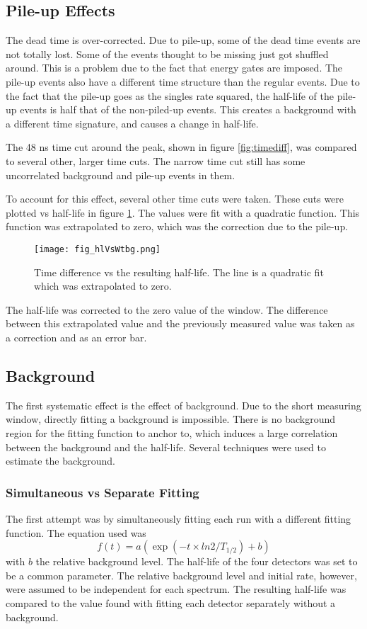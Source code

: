 \documentclass[MaxHughesThesis.tex]{subfiles}
\begin{document}
\subsection{Pile-up Effects}
The dead time is over-corrected. 
Due to pile-up, some of the dead time events are not totally lost.
Some of the events thought to be missing just got shuffled around.
This is a problem due to the fact that energy gates are imposed.
The pile-up events also have a different time structure than the regular events.
Due to the fact that the pile-up goes as the singles rate squared, the half-life of the pile-up events is half that of the non-piled-up events.
This creates a background with a different time signature, and causes a change in half-life.

The 48 ns time cut around the peak, shown in figure \ref{fig:timediff}, was compared to several other, larger time cuts.
The narrow time cut still has some uncorrelated background and pile-up events in them.


To account for this effect, several other time cuts were taken.
These cuts were plotted vs half-life in figure \ref{fig:timediffvhl}. 
The values were fit with a quadratic function.
This function was extrapolated to zero, which was the correction due to the pile-up.
\begin{figure}[!htb]
\centerline{\texttt{[image: fig\_hlVsWtbg.png]}}
\caption{Time difference vs the resulting half-life.
	 The line is a quadratic fit which was extrapolated to zero.
	}
\label{fig:timediffvhl}
\end{figure}
The half-life was corrected to the zero value of the window.
The difference between this extrapolated value and the previously measured value was taken as a correction and as an error bar.
 
\subsection{Background}

The first systematic effect is the effect of background.
Due to the short measuring window, directly fitting a background is impossible.
There is no background region for the fitting function to anchor to, which induces a large correlation between the background and the half-life.
Several techniques were used to estimate the background.

\subsubsection{Simultaneous vs Separate Fitting}
The first attempt was by simultaneously fitting each run with a different fitting function.
The equation used was 
%
\begin{equation}
	f(t) = a(\exp(-t \times ln2/T_{1/2}) + b)
	\label{eq:fit-bg}
\end{equation}
%
with $b$ the relative background level.
The half-life of the four detectors was set to be a common parameter. 
The relative background level and initial rate, however, were assumed to be independent for each spectrum.
The resulting half-life was compared to the value found with fitting each detector separately without a background.
\end{document}
